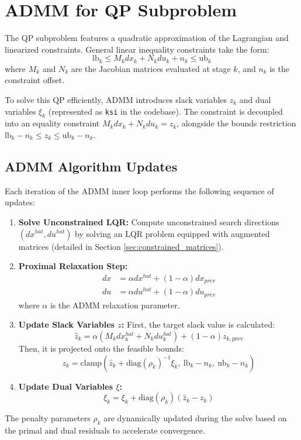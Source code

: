 \documentclass[11pt]{article}
\begin{document}
\section{ADMM for QP Subproblem}
The QP subproblem features a quadratic approximation of the Lagrangian and linearized constraints. General linear inequality constraints take the form:
\begin{equation}
    \text{lb}_k \le M_k dx_k + N_k du_k + n_k \le \text{ub}_k
\end{equation}
where $M_k$ and $N_k$ are the Jacobian matrices evaluated at stage $k$, and $n_k$ is the constraint offset.

To solve this QP efficiently, ADMM introduces slack variables $z_k$ and dual variables $\xi_k$ (represented as \texttt{ksi} in the codebase). The constraint is decoupled into an equality constraint $M_k dx_k + N_k du_k = z_k$, alongside the bounds restriction $\text{lb}_k - n_k \le z_k \le \text{ub}_k - n_k$.

\subsection{ADMM Algorithm Updates}
Each iteration of the ADMM inner loop performs the following sequence of updates:
\begin{enumerate}
    \item \textbf{Solve Unconstrained LQR:} Compute unconstrained search directions $(dx^{hat}, du^{hat})$ by solving an LQR problem equipped with augmented matrices (detailed in Section \ref{sec:constrained_matrices}).
    \item \textbf{Proximal Relaxation Step:}
    \begin{align}
        dx &= \alpha dx^{hat} + (1 - \alpha) dx_{prev} \\
        du &= \alpha du^{hat} + (1 - \alpha) du_{prev}
    \end{align}
    where $\alpha$ is the ADMM relaxation parameter.
    \item \textbf{Update Slack Variables $z$:}
    First, the target slack value is calculated:
    \begin{equation}
        \hat{z}_k = \alpha (M_k dx^{hat}_k + N_k du^{hat}_k) + (1 - \alpha) z_{k, \text{prev}} 
    \end{equation}
    Then, it is projected onto the feasible bounds:
    \begin{equation}
        z_k = \text{clamp}\left(\hat{z}_k + \text{diag}(\rho_k)^{-1} \xi_k, \ \text{lb}_k - n_k, \ \text{ub}_k - n_k\right)
    \end{equation}
    \item \textbf{Update Dual Variables $\xi$:}
    \begin{equation}
        \xi_k = \xi_k + \text{diag}(\rho_k) (\hat{z}_k - z_k)
    \end{equation}
\end{enumerate}
The penalty parameters $\rho_k$ are dynamically updated during the solve based on the primal and dual residuals to accelerate convergence.
\end{document}
